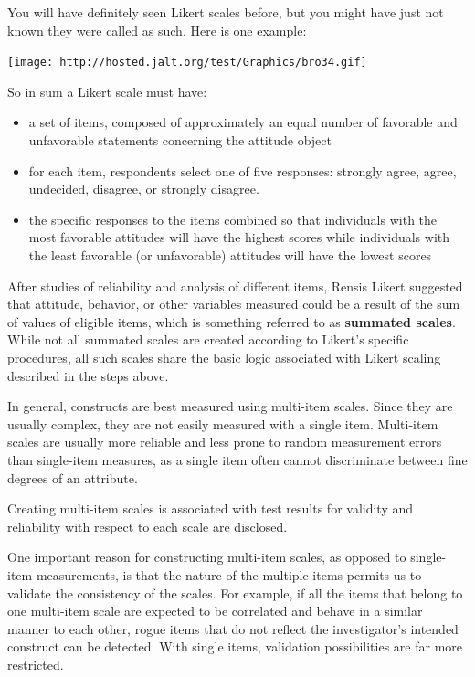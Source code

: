 \documentclass[
]{book}
\providecommand{\tightlist}{%
  \setlength{\itemsep}{0pt}\setlength{\parskip}{0pt}}
\begin{document}
You will have definitely seen Likert scales before, but you might have just not known they were called as such. Here is one example:

\texttt{[image: http://hosted.jalt.org/test/Graphics/bro34.gif]}

So in sum a Likert scale must have:

\begin{itemize}
\tightlist
\item
  a set of items, composed of approximately an equal number of favorable and unfavorable
  statements concerning the attitude object
\item
  for each item, respondents select one of five responses: strongly agree, agree,
  undecided, disagree, or strongly disagree.\\
\item
  the specific responses to the items combined so that individuals with the most favorable attitudes will have the highest scores while individuals with the least favorable (or unfavorable) attitudes will have the lowest scores
\end{itemize}

After studies of reliability and analysis of different items, Rensis Likert suggested that attitude, behavior, or other variables measured could be a result of the sum of values of eligible items, which is something referred to as \textbf{summated scales}. While not all summated scales are created according to Likert's specific procedures, all such scales share the basic logic associated with Likert scaling described in the steps above.

In general, constructs are best measured using multi-item scales. Since they are usually complex, they are not easily measured with a single item. Multi-item scales are usually more reliable and less prone to random measurement errors than single-item measures, as a single item often cannot discriminate between fine degrees of an attribute.

Creating multi-item scales is associated with test results for validity and reliability with respect to each scale are disclosed.

One important reason for constructing multi-item scales, as opposed to single-item measurements, is that the nature of the multiple items permits us to validate the consistency of the scales. For example, if all the items that belong to one multi-item scale are expected to be correlated and behave in a similar manner to each other, rogue items that do not reflect the investigator's intended construct can be detected. With single items, validation possibilities are far more restricted.
\end{document}
